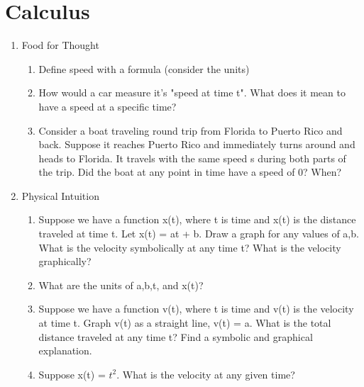 \documentclass{article}
\begin{document}
\section{Calculus}
\begin{enumerate}
    \item Food for Thought
    \begin{enumerate}
        \item Define speed with a formula (consider the units)
        \item How would a car measure it's "speed at time t". What does it mean to have a speed at a specific time?
        \item Consider a boat traveling round trip from Florida to Puerto Rico and back. Suppose it reaches Puerto Rico and immediately turns around and heads to Florida. It travels with the same speed s during both parts of the trip. Did the boat at any point in time have a speed of 0? When?
    \end{enumerate}

    \item Physical Intuition
    \begin{enumerate}
        \item Suppose we have a function x(t), where t is time and x(t) is the distance traveled at time t. Let x(t) = at + b. Draw a graph for any values of a,b. What is the velocity symbolically at any time t? What is the velocity graphically?
        \item What are the units of a,b,t, and x(t)?
        \item Suppose we have a function v(t), where t is time and v(t) is the velocity at time t. Graph v(t) as a straight line, v(t) = a. What is the total distance traveled at any time t? Find a symbolic and graphical explanation.
        \item Suppose x(t) = $t^2$. What is the velocity at any given time?
    \end{enumerate}
    

\end{enumerate}
\end{document}
